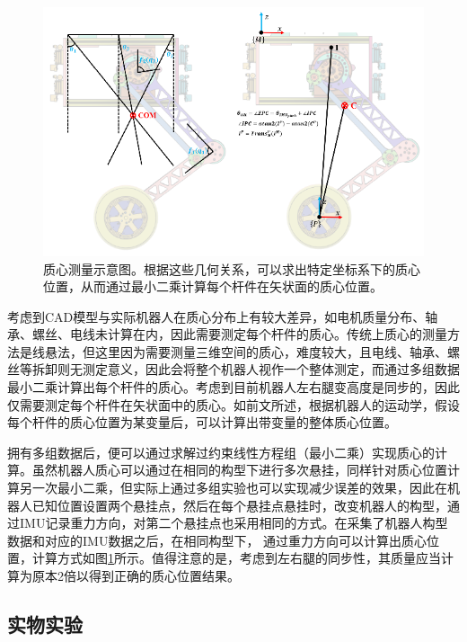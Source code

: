 \begin{figure}[h!]
  \centering
  \includegraphics[width=0.85\linewidth]{figures/Sec5/comdata.png}
  \caption{
  质心测量示意图。根据这些几何关系，可以求出特定坐标系下的质心位置，从而通过最小二乘计算每个杆件在矢状面的质心位置。
  }
  \label{fig:sec5-comdata}
   \vspace{6pt}
\end{figure}

考虑到CAD模型与实际机器人在质心分布上有较大差异，如电机质量分布、轴承、螺丝、电线未计算在内，因此需要测定每个杆件的质心。传统上质心的测量方法是线悬法，但这里因为需要测量三维空间的质心，难度较大，且电线、轴承、螺丝等拆卸则无测定意义，因此会将整个机器人视作一个整体测定，而通过多组数据最小二乘计算出每个杆件的质心。考虑到目前机器人左右腿变高度是同步的，因此仅需要测定每个杆件在矢状面中的质心。如前文所述，根据机器人的运动学，假设每个杆件的质心位置为某变量后，可以计算出带变量的整体质心位置。

拥有多组数据后，便可以通过求解过约束线性方程组（最小二乘）实现质心的计算。虽然机器人质心可以通过在相同的构型下进行多次悬挂，同样针对质心位置计算另一次最小二乘，但实际上通过多组实验也可以实现减少误差的效果，因此在机器人已知位置设置两个悬挂点，然后在每个悬挂点悬挂时，改变机器人的构型，通过IMU记录重力方向，对第二个悬挂点也采用相同的方式。在采集了机器人构型数据和对应的IMU数据之后，在相同构型下， 通过重力方向可以计算出质心位置，计算方式如图\ref{fig:sec5-comdata}所示。值得注意的是，考虑到左右腿的同步性，其质量应当计算为原本2倍以得到正确的质心位置结果。


\subsection{实物实验}

